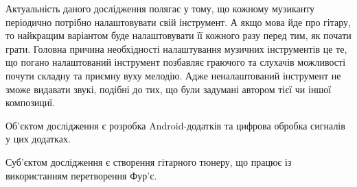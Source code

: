 
Актуальність даного дослідження полягає у тому, що кожному музиканту періодично потрібно налаштовувати свій інструмент. А якщо мова йде про гітару, то найкращим варіантом буде налаштовувати її кожного разу перед тим, як почати грати. Головна причина необхідності налаштування музичних інструментів це те, що погано налаштований інструмент позбавляє граючого та слухачів можливості почути складну та приємну вуху мелодію. Адже неналаштований інструмент не зможе видавати звукі, подібні до тих, що були задумані автором тієї чи іншої композициї.

Об'єктом дослідження є розробка Android-додатків та цифрова обробка сигналів у цих додатках.

Суб'єктом дослідження є створення гітарного тюнеру, що працює із використанням перетворення Фур'є.
